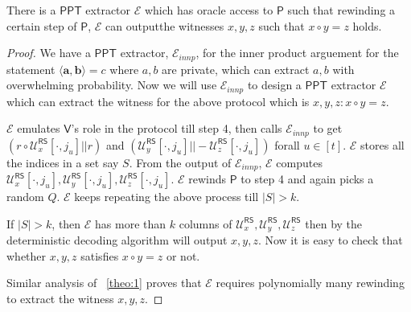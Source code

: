 \documentclass[runningheads]{llncs}
\newcommand{\innp}[2]{\langle #1,#2\rangle}
\def\ppt{\mathsf{PPT}}
\def\extrac{\mathcal{E}}
\def\prover{\mathsf{P}}
\def\verifier{\mathsf{V}}
\def\RS{\mathsf{RS}} %
\def\calU{\mathcal{U}}
\begin{document}
	\begin{theorem}
	There is a $\ppt$ extractor $\extrac$ which has oracle access to $\prover$ such that rewinding a certain step of $\prover$, $\extrac$ can outputthe witnesses $x, y, z$ such that $x\circ y = z$ holds.
	\end{theorem}
	\begin{proof}
	We have a $\ppt$ extractor, $\extrac_{innp}$, for the inner product arguement for the statement $\innp{\bm{a}}{\bm{b}}=c$ where $a,b$ are private, which can extract $a, b$ with overwhelming probability. Now we will use $\extrac_{innp}$ to design a $\ppt$ extractor $\extrac$ which can extract the witness for the above protocol which is $x,y,z : x \circ y = z$.
	
	 $\extrac$ emulates $\verifier$'s role in the protocol till step 4, then calls $\extrac_{innp}$ to get $(r\circ \calU^{\RS}_x[\cdot,j_u]||r)$ and $(\calU^{\RS}_y[\cdot,j_u]||-\calU^{\RS}_z[\cdot,j_u])$ forall $u\in [t]$. $\extrac$ stores all the indices in a set say $S$. From the output of $\extrac_{innp}$, $\extrac$ computes $\calU^{\RS}_x[\cdot,j_u], \calU^{\RS}_y[\cdot,j_u],\calU^{\RS}_z[\cdot,j_u]$. $\extrac$ rewinds $\prover$ to step 4 and again picks a random $Q$. $\extrac$ keeps repeating the above process till $|S|>k$.
	 
	 If $|S|>k$, then $\extrac$ has more than $k$ columns of $\calU^{\RS}_x, \calU^{\RS}_y, \calU^{\RS}_z$ then by the deterministic decoding algorithm will output $x, y, z$. Now it is easy to check that whether $x, y, z$ satisfies $x \circ y =z$ or not. 
	 
	 Similar analysis of ~\ref{theo:1} proves that $\extrac$ requires polynomially many rewinding to extract the witness $x, y, z$.
	\end{proof}
	
\end{document}
